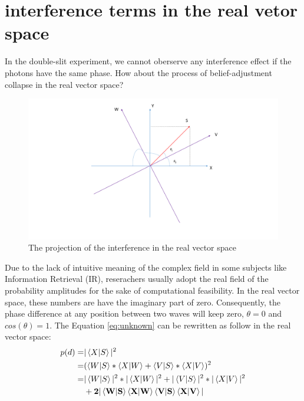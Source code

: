 \documentclass[11pt,notitlepage]{article}
\begin{document}
\section{interference terms in the real vetor space}

In the double-slit experiment, we cannot oberserve any interference effect if the photons have the same phase. How about the process of belief-adjustment collapse in the real vector space?

\begin{figure}[!htb]
\centering
\includegraphics[width = 12 cm]{graph/projection.pdf}
\caption{The projection of the interference in the real vector space}
\label{fig:projection}
\end{figure}

Due to the lack of intuitive meaning of the complex field in some subjects like Information Retrieval (IR), reserachers usually adopt the real field of the probability amplitudes for the sake of computational feasibility. In the real vector space, these numbers are have the imaginary part of zero. Consequently, the phase difference at any position between two waves will keep zero, $\theta=0$ and $cos(\theta)=1$. The Equation \ref{eq:unknown} can be rewritten as follow in the real vector space:
\begin{equation}
\begin{split}
p(d)=&\vert \braket{X|S}\vert ^2 \\
=&(\braket{W|S} *\braket{X|W} +\braket{V|S}* \braket{X|V})^2 \\
=&|\braket{W|S}|^2*|\braket{X|W}|^2  +|\braket{V|S}|^2*|\braket{X|V}|^2 \\
&+\mathbf{2\vert \braket{W|S} \braket{X|W} \braket{V|S} \braket{X|V} \vert }
\end{split}
\label{eq:unknown_real}
\end{equation}
\end{document}
